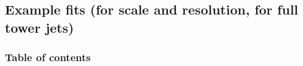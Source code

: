 \documentclass[8pt]{beamer}
\begin{document}
%      
%      
%     
%      
%      
%     
%      
 
 \subsection{Example fits (for scale and resolution, for full tower jets)}

\begin{frame}
 \frametitle{Table of contents}
 
\end{frame}
\end{document}
